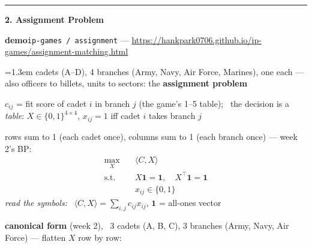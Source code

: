 \documentclass[10pt]{article}
\newcommand{\beat}[2]{%
  \par\medskip\needspace{8\baselineskip}%
  {\color{ruleink}\rule{\textwidth}{1pt}}\par\nobreak\vspace{2pt}
  {\large\bfseries #1.\; #2}\par\nobreak\vspace{3pt}}
\newenvironment{board}{%
  \par\vspace{2pt}
  \begingroup\leftskip=1.3em\relax}{%
  \par\endgroup\vspace{2pt}}
\newcommand{\demo}[2]{\par{\leavevmode\color{demoink}\small\textbf{demo}\quad\texttt{#1} --- #2}\par}
\begin{document}
\beat{2}{Assignment Problem}
\demo{ip-games / assignment}{\url{https://hankpark0706.github.io/ip-games/assignment-matching.html}}
\begin{board}
4 cadets (A--D), 4 branches (Army, Navy, Air Force, Marines), one each --- also officers to billets, units to sectors: the \textbf{assignment problem}
\vspace{2pt}

$c_{ij}$ = fit score of cadet $i$ in branch $j$ (the game's 1--5 table); \ the decision is a \emph{table}: \quad
$X \in \{0,1\}^{4\times 4}$, \quad $x_{ij} = 1$ iff cadet $i$ takes branch $j$
\vspace{2pt}

rows sum to 1 (each cadet once), columns sum to 1 (each branch once) --- week 2's BP:
\[
\begin{aligned}
  \max_X\quad & \langle C, X \rangle \\
  \text{s.t.}\quad & X \mathbf{1} = \mathbf{1}, \quad X^{\top}\mathbf{1} = \mathbf{1} \\
                   & x_{ij} \in \{0,1\}
\end{aligned}
\]
\emph{read the symbols:} \ $\langle C, X \rangle = \sum_{i,j} c_{ij} x_{ij}$, \quad $\mathbf{1}$ = all-ones vector
\vspace{2pt}

\textbf{canonical form} (week 2), \ 3 cadets (A, B, C), 3 branches (Army, Navy, Air Force) --- flatten $X$ row by row:
\vspace{1pt}


\end{board}
\end{document}
